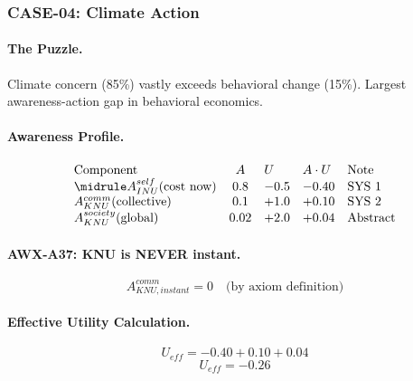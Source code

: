 
\subsubsection{CASE-04: Climate Action}

\paragraph{The Puzzle.}
Climate concern (85\%) vastly exceeds behavioral change (15\%). Largest awareness-action gap in behavioral economics.

\paragraph{Awareness Profile.}

\begin{equation}
\begin{array}{lclll}
\text{Component} & A & U & A \cdot U & \text{Note} \\
\midrule
A^{self}_{INU}(\text{cost now}) & 0.8 & -0.5 & -0.40 & \text{SYS 1} \\
A^{comm}_{KNU}(\text{collective}) & 0.1 & +1.0 & +0.10 & \text{SYS 2} \\
A^{society}_{KNU}(\text{global}) & 0.02 & +2.0 & +0.04 & \text{Abstract}
\end{array}
\end{equation}

\paragraph{AWX-A37: KNU is NEVER instant.}
\begin{equation}
A^{comm}_{KNU,instant} = 0 \quad \text{(by axiom definition)}
\end{equation}

\paragraph{Effective Utility Calculation.}
\begin{equation}
U_{eff} = -0.40 + 0.10 + 0.04
\end{equation}
\begin{equation}
\boxed{U_{eff} = \mathbf{-0.26}}
\end{equation}

